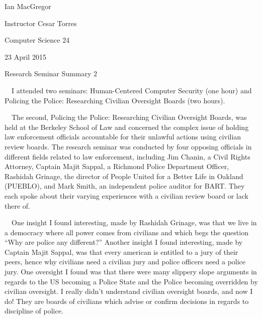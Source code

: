 \documentclass{article}
\title{}
\begin{document}
Ian MacGregor

Instructor Cesar Torres

Computer Science 24

23 April 2015

\begin{center}
Research Seminar Summary 2
\end{center}

\ \ I attended two seminars: Human-Centered Computer Security (one hour) and Policing the Police: Researching Civilian Oversight Boards (two hours). 

\ \ The second, Policing the Police: Researching Civilian Oversight Boards, was held at the Berkeley School of Law and concerned the complex issue of holding law enforcement officials accountable for their unlawful actions using civilian review boards. The research seminar was conducted by four opposing officials in different fields related to law enforcement, including Jim Chanin, a Civil Rights Attorney, Captain Majit Sappal, a Richmond Police Department Officer, Rashidah Grinage, the director of People United for a Better Life in Oakland (PUEBLO), and Mark Smith, an independent police auditor for BART. They each spoke about their varying experiences with a civilian review board or lack there of. 

\ \ One insight I found interesting, made by Rashidah Grinage, was that we live in a democracy where all power comes from civilians and which begs the question ``Why are police any different?'' Another insight I found interesting, made by Captain Majit Sappal, was that every american is entitled to a jury of their peers, hence why civilians need a civilian jury and police officers need a police jury. One oversight I found was that there were many slippery slope arguments in regards to the US becoming a Police State and the Police becoming overridden by civilian oversight. I really didn't understand civilian oversight boards, and now I do! They are boards of civilians which advise or confirm decisions in regards to discipline of police. 
\end{document}
